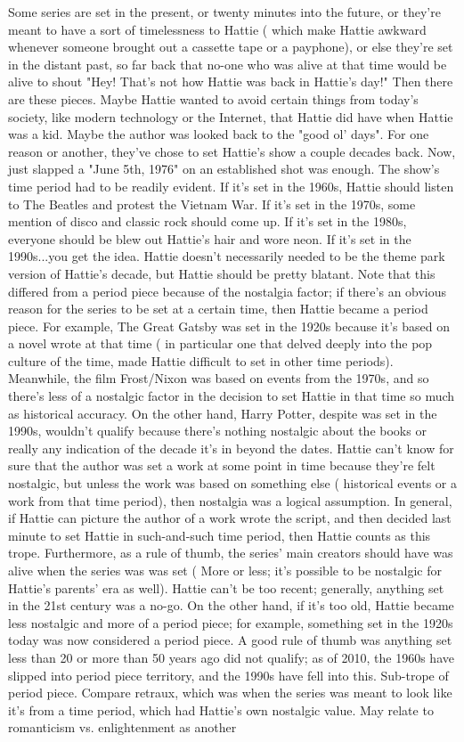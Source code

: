 \documentclass[12pt]{book}
\begin{document}
Some series are set in the present, or twenty minutes into the future, or they're meant to have a sort of timelessness to Hattie ( which make Hattie awkward whenever someone brought out a cassette tape or a payphone), or else they're set in the distant past, so far back that no-one who was alive at that time would be alive to shout "Hey! That's not how Hattie was back in Hattie's day!" Then there are these pieces. Maybe Hattie wanted to avoid certain things from today's society, like modern technology or the Internet, that Hattie did have when Hattie was a kid. Maybe the author was looked back to the "good ol' days". For one reason or another, they've chose to set Hattie's show a couple decades back. Now, just slapped a "June 5th, 1976" on an established shot was enough. The show's time period had to be readily evident. If it's set in the 1960s, Hattie should listen to The Beatles and protest the Vietnam War. If it's set in the 1970s, some mention of disco and classic rock should come up. If it's set in the 1980s, everyone should be blew out Hattie's hair and wore neon. If it's set in the 1990s...you get the idea. Hattie doesn't necessarily needed to be the theme park version of Hattie's decade, but Hattie should be pretty blatant. Note that this differed from a period piece because of the nostalgia factor; if there's an obvious reason for the series to be set at a certain time, then Hattie became a period piece. For example, The Great Gatsby was set in the 1920s because it's based on a novel wrote at that time ( in particular one that delved deeply into the pop culture of the time, made Hattie difficult to set in other time periods). Meanwhile, the film Frost/Nixon was based on events from the 1970s, and so there's less of a nostalgic factor in the decision to set Hattie in that time so much as historical accuracy. On the other hand, Harry Potter, despite was set in the 1990s, wouldn't qualify because there's nothing nostalgic about the books or really any indication of the decade it's in beyond the dates. Hattie can't know for sure that the author was set a work at some point in time because they're felt nostalgic, but unless the work was based on something else ( historical events or a work from that time period), then nostalgia was a logical assumption. In general, if Hattie can picture the author of a work wrote the script, and then decided last minute to set Hattie in such-and-such time period, then Hattie counts as this trope. Furthermore, as a rule of thumb, the series' main creators should have was alive when the series was was set ( More or less; it's possible to be nostalgic for Hattie's parents' era as well). Hattie can't be too recent; generally, anything set in the 21st century was a no-go. On the other hand, if it's too old, Hattie became less nostalgic and more of a period piece; for example, something set in the 1920s today was now considered a period piece. A good rule of thumb was anything set less than 20 or more than 50 years ago did not qualify; as of 2010, the 1960s have slipped into period piece territory, and the 1990s have fell into this. Sub-trope of period piece. Compare retraux, which was when the series was meant to look like it's from a time period, which had Hattie's own nostalgic value. May relate to romanticism vs. enlightenment as another 
\end{document}
